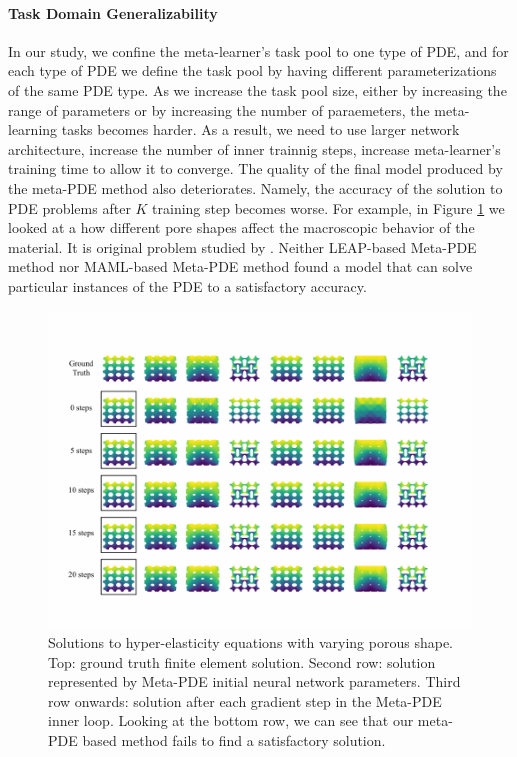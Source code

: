 \paragraph{Task Domain Generalizability} In our study, we confine the meta-learner's task pool to one type of PDE, and for each type of PDE we define the task pool by having different parameterizations of the same PDE type. As we increase the task pool size, either by increasing the range of parameters or by increasing the number of paraemeters, the meta-learning tasks becomes harder. As a result, we need to use larger network architecture, increase the number of inner trainnig steps, increase meta-learner's training time to allow it to converge. The quality of the final model produced by the meta-PDE method also deteriorates. Namely, the accuracy of the solution to PDE problems after $K$ training step becomes worse. For example, in Figure \ref{fig:elasticity_flower_meta} we looked at a how different pore shapes affect the macroscopic behavior of the material. It is original problem studied by \citet{overvelde2014relating}. Neither LEAP-based Meta-PDE method nor MAML-based Meta-PDE method found a model that can solve particular instances of the PDE to a satisfactory accuracy. \\
\begin{figure}[h]
  \centering
\includegraphics[width=0.8\linewidth]{figures/hyper_elasticity_circle_meta.pdf}
\caption{Solutions to hyper-elasticity equations with varying porous shape. Top: ground truth finite element solution. Second row: solution represented by Meta-PDE initial neural network parameters. Third row onwards: solution after each gradient step in the Meta-PDE inner loop. Looking at the bottom row, we can see that our meta-PDE based method fails to find a satisfactory solution. }%
\label{fig:elasticity_flower_meta}%
\end{figure}

